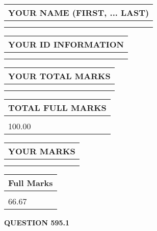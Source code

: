 \documentclass{ctexart}
\begin{document}
   
   
   
\newpage 
\setcounter{page}{ 
   595001 } 
   
   
   
   
\noindent\begin{tabular}{|l|}
\hline
YOUR NAME (FIRST, ... LAST)  \\
\hline
 \\ 
 \\ 
\hline
\end{tabular}
\hspace{0.05in} \begin{tabular}{|l|}
\hline
 YOUR   ID   INFORMATION  \\
\hline
 \\ 
 \\ 
\hline
\end{tabular}
   
   
\vspace{0.2in}\noindent\begin{tabular}{|l|}
\hline
YOUR TOTAL MARKS  \\
\hline
 \\ 
 \\ 
\hline
\end{tabular}
\hspace{0.05in} \begin{tabular}{|l|}
\hline
TOTAL FULL MARKS  \\
\hline
 \\ 
100.00 \\
\hline
\end{tabular}
   
   
 \vspace{0.2in}
 
 
 
 
   
   
  
\vspace{0.2in}
  
\noindent\begin{tabular}{|l|}
\hline
 YOUR MARKS  \\
\hline
 \\ 
 \\ 
\hline
\end{tabular}
\hspace{0.05in} \begin{tabular}{|l|}
\hline
 Full Marks  \\
\hline
 \\ 
66.67 \\
\hline
\end{tabular}
{\textbf{\Large{QUESTION
595.1 
}}}
  
\end{document}
